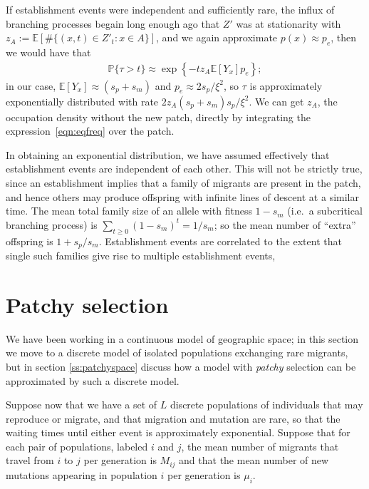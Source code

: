 \documentclass{article}
\renewcommand{\P}{\mathbb{P}}
\newcommand{\E}{\mathbb{E}}
\begin{document}
If establishment events were independent and sufficiently rare,
the influx of branching processes begain long enough ago that $Z'$ was at stationarity
with $z_A := \E[ \# \{ (x,t) \in Z'_t : x \in A \} ]$,
and we again approximate $p(x) \approx p_e$,
then we would have that 
\begin{align}
  \P\{\tau>t\} \approx \exp\left\{ - t z_A \E[Y_x] p_e \right\} ;
\end{align}
in our case, $\E[Y_x] \approx (s_p+s_m)$ and $p_e \approx 2 s_p/\xi^2$,
so $\tau$ is approximately exponentially distributed with rate $ 2 z_A (s_p+s_m) s_p/\xi^2 $.
We can get $z_A$, the occupation density without the new patch, 
directly by integrating the expression~\eqref{eqn:eqfreq} over the patch.

In obtaining an exponential distribution, we have assumed effectively that establishment events
are independent of each other.
This will not be strictly true, since an establishment implies that a family of migrants are present in the patch,
and hence others may produce offspring with infinite lines of descent at a similar time.
The mean total family size of an allele with fitness $1-s_m$ (i.e.\ a subcritical branching process) is $\sum_{t \ge 0} (1-s_m)^t = 1/s_m$;
so the mean number of ``extra'' offspring is $1+s_p/s_m$.
Establishment events are correlated to the extent that single such families give rise to multiple establishment events,






\section{Patchy selection} 
\label{ss:discretedemes}

We have been working in a continuous model of geographic space; 
in this section we move to a discrete model of isolated populations exchanging rare migrants,
but in section \ref{ss:patchyspace} discuss how a model with {\em patchy} selection can be approximated by such a discrete model.

Suppose now that we have a set of $L$ discrete populations of individuals that may reproduce or migrate,
and that migration and mutation are rare, so that the waiting times until either event is approximately exponential.
Suppose that for each pair of populations, labeled $i$ and $j$, the mean number of migrants that travel from $i$ to $j$ per generation
is $M_{ij}$ and that the mean number of new mutations appearing in population $i$ per generation is $\mu_i$.
\end{document}
